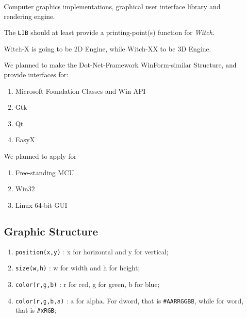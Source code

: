 Computer graphics implementations, graphical user interface library and rendering engine.

The \verb|LIB| should at least provide a printing-point(s) function for \textit{Witch}.

Witch-X is going to be 2D Engine, while Witch-XX to be 3D Engine.

We planned to make the Dot-Net-Framework WinForm-similar Structure, and provide interfaces for:

\begin{enumerate}

\item Microsoft Foundation Classes and Win-API
\item Gtk
\item Qt
\item EasyX
\end{enumerate}

We planned to apply for

\begin{enumerate}

\item Free-standing MCU
\item Win32
\item Linux 64-bit GUI
\end{enumerate}



\subsection{Graphic Structure}

\begin{enumerate}

\item \verb|position(x,y)|  : x for horizontal and y for vertical;
\item \verb|size(w,h)|      : w for width and h for height;
\item \verb|color(r,g,b)|   : r for red, g for green, b for blue;
\item \verb|color(r,g,b,a)| : a for alpha. For dword, that is \verb|#AARRGGBB|, while for word, that is \verb|#xRGB|;
\end{enumerate}

